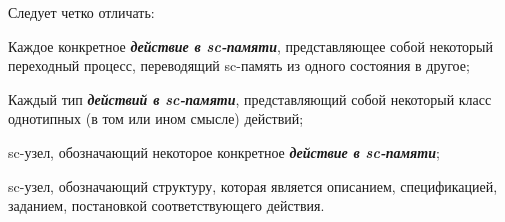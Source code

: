 \begin{SCn}
{Следует четко отличать:
\begin{scnitemize}
\item Каждое конкретное \textbf{\textit{действие в sc-памяти}}, представляющее собой некоторый переходный процесс, переводящий sc-память из одного состояния в другое;
\item Каждый тип \textbf{\textit{действий в sc-памяти}}, представляющий собой некоторый класс однотипных (в том или ином смысле) действий;
\item sc-узел, обозначающий некоторое конкретное \textbf{\textit{действие в sc-памяти}};
\item sc-узел, обозначающий структуру, которая является описанием, спецификацией, заданием, постановкой соответствующего действия.
\end{scnitemize}
}


\end{SCn}
